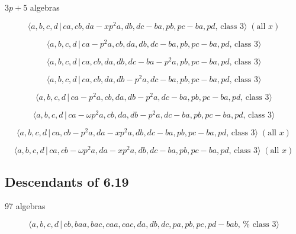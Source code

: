 \documentclass[10pt]{article}
\begin{document}
$3p+5$ algebras

\begin{equation}
\langle a,b,c,d\,|\,ca,cb,da-xp^2a,db,dc-ba,pb,pc-ba,pd,\,\text{class }%
3\rangle \;(\text{all }x)  \tag{7.3728}
\end{equation}

\begin{equation}
\langle a,b,c,d\,|\,ca-p^2a,cb,da,db,dc-ba,pb,pc-ba,pd,\,\text{class }%
3\rangle  \tag{7.3729}
\end{equation}

\begin{equation}
\langle a,b,c,d\,|\,ca,cb,da,db,dc-ba-p^2a,pb,pc-ba,pd,\,\text{class }%
3\rangle  \tag{7.3730}
\end{equation}

\begin{equation}
\langle a,b,c,d\,|\,ca,cb,da,db-p^2a,dc-ba,pb,pc-ba,pd,\,\text{class }%
3\rangle  \tag{7.3731}
\end{equation}

\begin{equation}
\langle a,b,c,d\,|\,ca-p^2a,cb,da,db-p^2a,dc-ba,pb,pc-ba,pd,\,\text{class }%
3\rangle  \tag{7.3732}
\end{equation}

\begin{equation}
\langle a,b,c,d\,|\,ca-\omega p^{2}a,cb,da,db-p^{2}a,dc-ba,pb,pc-ba,pd,\,%
\text{class }3\rangle  \tag{7.3733}
\end{equation}

\begin{equation}
\langle a,b,c,d\,|\,ca,cb-p^2a,da-xp^2a,db,dc-ba,pb,pc-ba,pd,\,\text{class }%
3\rangle \;(\text{all }x)  \tag{7.3734}
\end{equation}

\begin{equation}
\langle a,b,c,d\,|\,ca,cb-\omega p^{2}a,da-xp^{2}a,db,dc-ba,pb,pc-ba,pd,\,%
\text{class }3\rangle \;(\text{all }x)  \tag{7.3735}
\end{equation}

\subsection{Descendants of 6.19}

97 algebras

\begin{equation}
\langle a,b,c,d\,|\,cb,baa,bac,caa,cac,da,db,dc,pa,pb,pc,pd-bab,\,\text{%
class }3\rangle  \tag{7.3736}
\end{equation}
\end{document}
